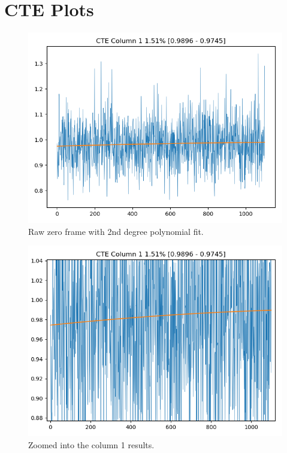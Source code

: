 \documentclass[letter,11pt,oneside]{article}
\begin{document}
\appendix
\renewcommand \thesection{\Alph{section}}

\section{CTE Plots}

\begin{figure}[h!]
\centering
\includegraphics[width=\textwidth]{images/CTECol1.png}
\caption{Raw zero frame with 2nd degree polynomial fit.} %
\label{figure:CTECol1}
\end{figure}

\begin{figure}[h!]
\centering
\includegraphics[width=\textwidth]{images/CTECol1_Zoomed.png}
\caption{Zoomed into the column 1 results.} %
\label{figure:CTECol1_Zoomed}
\end{figure}
\end{document}

